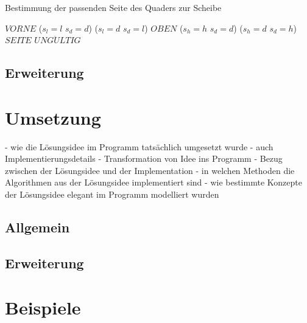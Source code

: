 \documentclass[a4paper,10pt,ngerman]{scrartcl}
\begin{document}
    \begin{algorithm}[H]
        \caption{Bestimmung der passenden Seite des Quaders zur Scheibe}
        \label{alg:cheese2}
        \begin{algorithmic}
                    \State \Return $VORNE$
                \ElsIf
                        {($s_{l} = l$ \land $s_{d} = d$) \lor ($s_{l} = d$ \land $s_{d} = l$)}
                    \State \Return $OBEN$
                \ElsIf
                        {($s_{h} = h$ \land $s_{d} = d$) \lor ($s_{h} = d$ \land $s_{d} = h$)}
                    \State \Return $SEITE$
                \Else
                    \State \Return $UNG\ddot ULTIG$
                \EndIf
            \EndFunction
        \end{algorithmic}
    \end{algorithm}

    \subsection{Erweiterung}\label{subsec:erweiterung_losungsidee}

    \newpage


    \section{Umsetzung}\label{sec:umsetzung}
    - wie die Lösungsidee im Programm tatsächlich umgesetzt wurde
    - auch Implementierungsdetails
    - Transformation von Idee ins Programm
    - Bezug zwischen der Lösungsidee und der Implementation
    - in welchen Methoden die Algorithmen aus der Lösungsidee implementiert sind
    - wie bestimmte Konzepte der Lösungsidee elegant im Programm modelliert wurden

    \subsection{Allgemein}\label{subsec:allgemein2}

    \subsection{Erweiterung}\label{subsec:erweiterung2}

    \newpage


    \section{Beispiele}\label{sec:beispiele}
\end{document}
